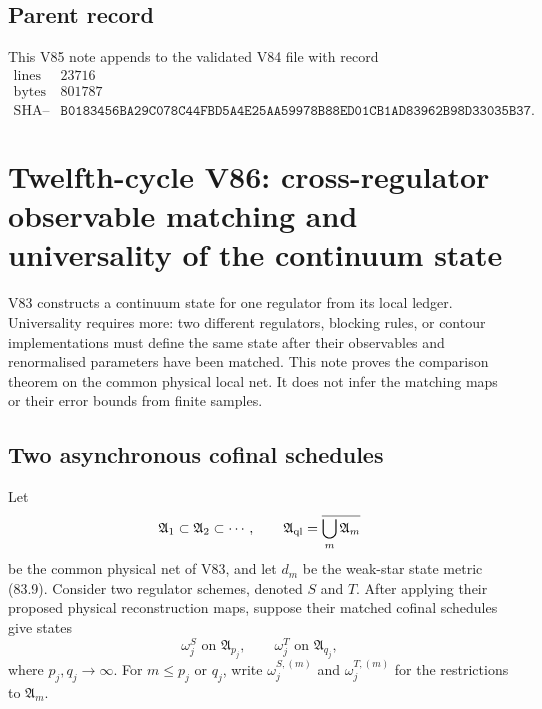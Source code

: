 \documentclass[11pt]{article}
\theoremstyle{remark}
\begin{document}
\subsection{Parent record}

This V85 note appends to the validated V84 file with record
\[
\begin{array}{c|c}
\text{lines}&23716\\
\text{bytes}&801787\\
\text{SHA--256}&
\texttt{B0183456BA29C078C44FBD5A4E25AA59978B88ED01CB1AD83962B98D33035B37}.
\end{array}
\]



\section{Twelfth-cycle V86: cross-regulator observable matching and
universality of the continuum state}
\label{sec:v12v86}

V83 constructs a continuum state for one regulator from its local
ledger.  Universality requires more: two different regulators,
blocking rules, or contour implementations must define the same
state after their observables and renormalised parameters have been
matched.  This note proves the comparison theorem on the common
physical local net.  It does not infer the matching maps or their
error bounds from finite samples.

\subsection{Two asynchronous cofinal schedules}

Let
\[
 {\mathfrak A}_1\subset{\mathfrak A}_2\subset\cdots,\qquad
 {\mathfrak A}_{\rm ql}
 =\overline{\bigcup_m{\mathfrak A}_m}
\]
be the common physical net of V83, and let \(d_m\) be the
weak-star state metric (83.9).  Consider two regulator schemes,
denoted \(S\) and \(T\).  After applying their proposed physical
reconstruction maps, suppose their matched cofinal schedules give
states
\[
 \omega_j^S\text{ on }{\mathfrak A}_{p_j},\qquad
 \omega_j^T\text{ on }{\mathfrak A}_{q_j},                  \tag{86.1}
\]
where \(p_j,q_j\to\infty\).  For \(m\leq p_j\) or \(q_j\), write
\(\omega_j^{S,(m)}\) and \(\omega_j^{T,(m)}\) for the restrictions
to \({\mathfrak A}_m\).
\end{document}
